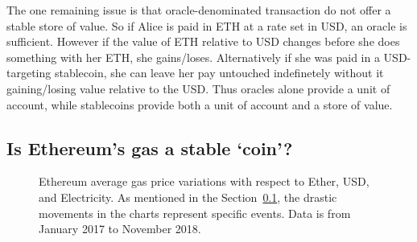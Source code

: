The one remaining issue is that oracle-denominated transaction do not offer a stable store of value. So if Alice is paid in ETH at a rate set in USD, an oracle is sufficient. However if the value of ETH relative to USD changes before she does something with her ETH, she gains/loses. Alternatively if she was paid in a USD-targeting stablecoin, she can leave her pay untouched indefinetely without it gaining/losing value relative to the USD. Thus oracles alone provide a unit of account, while stablecoins provide both a unit of account and a store of value. 


\subsection {Is Ethereum's gas a stable `coin'?}\label{sec:GasInvs}

\begin{figure}[t]
	\centering
	\hfill
	\caption {Ethereum average gas price variations with respect to Ether, USD, and Electricity. As mentioned in the Section~\ref{sec:GasInvs}, the drastic movements in the charts represent specific events. Data is from January 2017 to November 2018.}
	\label{fig:gas}
\end{figure}

